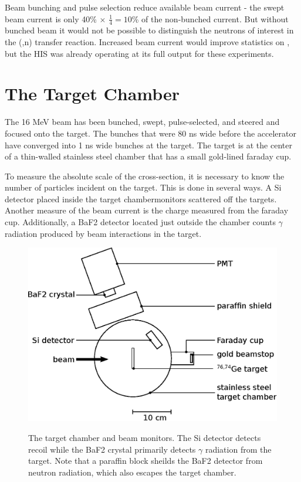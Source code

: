 Beam bunching and pulse selection reduce available beam current - the swept beam current is only 40\% $\times$ $\frac{1}{4} = 10$\% of the non-bunched current.  But without bunched beam it would not be possible to distinguish the neutrons of interest in the (,n) transfer reaction.  Increased beam current would improve statistics on \reaction, but the HIS was already operating at its full output for these experiments.

\section{The Target Chamber}

The 16 MeV  beam has been bunched, swept, pulse-selected, and steered and focused onto the target.  The bunches that were 80 ns wide before the accelerator have converged into 1 ns wide bunches at the target.  The target is at the center of a thin-walled stainless steel chamber that has a small gold-lined faraday cup.   

To measure the absolute scale of the cross-section, it is necessary to know the number of particles incident on the target.  This is done in several ways.  A Si detector placed inside the target chambermonitors  scattered off the targets.  Another measure of the beam current is the charge measured from the faraday cup.  Additionally, a BaF2 detector located just outside the chamber counts $\gamma$ radiation produced by beam interactions in the target.  
\begin{figure}[htp]
\centering
\includegraphics[width=1.0\textwidth]{figures/targetChamber.eps}
\label{fig:targetChamber}
\caption{The target chamber and beam monitors.  The Si detector detects recoil  while the BaF2 crystal primarily detects $\gamma$ radiation from the target.  Note that a paraffin block sheilds the BaF2 detector from neutron radiation, which also escapes the target chamber.}
\end{figure}


